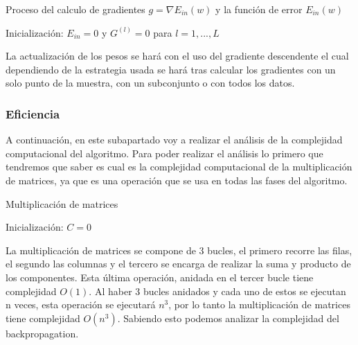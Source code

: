 \begin{algorithm}[H]
   \caption{Proceso del calculo de gradientes $g = \nabla E_{in}(w)$ y la función de error $E_{in}(w)$}
   Inicialización: $E_{in} = 0$ y $G^{(l)} = 0 $ para $l = 1,...,L$ \\
\end{algorithm}

La actualización de los pesos se hará con el uso del gradiente descendente el cual dependiendo de la estrategia usada se hará tras calcular los gradientes con un solo punto de la muestra, con un subconjunto o con todos los datos.

\subsubsection{Eficiencia}

A continuación, en este subapartado voy a realizar el análisis de la complejidad computacional del algoritmo. Para poder realizar el análisis lo primero que tendremos que saber es cual es la complejidad computacional de la multiplicación de matrices, ya que es una operación que se usa en todas las fases del algoritmo.

\begin{algorithm}[H]
   \caption{Multiplicación de matrices}
   Inicialización: $C = 0$\\
\end{algorithm}

La multiplicación de matrices se compone de 3 bucles, el primero recorre las filas, el segundo las columnas y el tercero se encarga de realizar la suma y producto de los componentes. Esta última operación, anidada en el tercer bucle tiene complejidad $O(1)$. Al haber 3 bucles anidados y cada uno de estos se ejecutan n veces, esta operación se ejecutará $n^{3}$, por lo tanto la multiplicación de matrices tiene complejidad $O(n^3)$. Sabiendo esto podemos analizar la complejidad del backpropagation.

